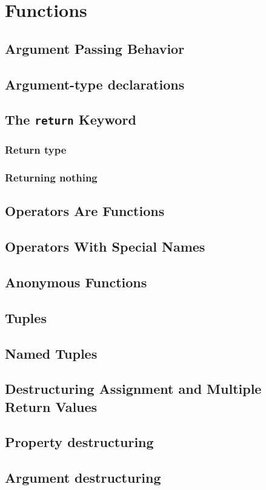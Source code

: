   \chapter{Functions}
    \section{Argument Passing Behavior}
    \section{Argument-type declarations}
    \section{The \texttt{return} Keyword}
    \subsection{Return type}
    \subsection{Returning nothing}
    \section{Operators Are Functions}
    \section{Operators With Special Names}
    \section{Anonymous Functions}
    \section{Tuples}
    \section{Named Tuples}
    \section{Destructuring Assignment and Multiple Return Values}
    \section{Property destructuring}
    \section{Argument destructuring}
